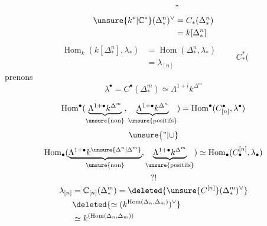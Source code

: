 

\[
\begin{aligned}
&\text{''}\\
\unsure{k^*|\mathbb C^*}(\Delta_*^n)^\vee
&=C_*(\Delta_*^n)\\
&=k[\Delta_*^n]
\end{aligned}
\]
\[
\begin{aligned}
\operatorname{Hom}_k(k[\Delta_*^n],\lambda_*)&=\operatorname{Hom}(\Delta_*^n,\lambda_*)\\
&=\lambda_{[n]}
\end{aligned}
\qquad C_*^*(
\]
prenons
\[
\lambda^\bullet=C^\bullet(\Delta_*^m)\simeq\Lambda^{1+i}k^{\Delta^m}
\]

\[
\operatorname{Hom}^\bullet(
\underbrace{\Lambda^{1+\bullet}k^{\Delta^m}}_{\unsure{\text{non}}},
\underbrace{\Lambda^{1+\bullet}k^{\Delta^n}}_{\unsure{\text{positifs}}})
=\operatorname{Hom}^\bullet(C_{[n]}^\bullet,\lambda^\bullet)
\]
\[
\unsure{\text{''}|\cup}
\]
\[
\operatorname{Hom}_\bullet(
\underbrace{\Lambda^{1+\bullet}k^{\unsure{\Delta^n|\Delta^m}}}_{\unsure{\text{non}}},
\underbrace{\Lambda^{1+\bullet}k^{\Delta^m}}_{\unsure{\text{positifs}}})
\simeq\operatorname{Hom}_\bullet(C_\bullet^{[n]},\lambda_\bullet)
\]
\[
?!
\]
\[
\begin{aligned}
\lambda_{[n]}&=\mathbb C_{[n]}(\Delta_*^m)
=\deleted{\unsure{C^{[n]}}(\Delta_*^m)^\vee}\\
&\deleted{\simeq(k^{\operatorname{Hom}(\Delta_n,\Delta_m)})^\vee}\\
&\simeq k^{(\operatorname{Hom}(\Delta_n,\Delta_m))}
\end{aligned}
\]

